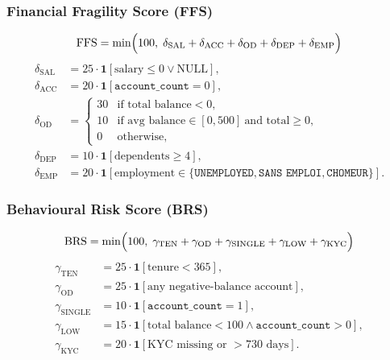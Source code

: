 \subsubsection{Financial Fragility Score (FFS)}
\begin{equation}
\label{eq:ffs}
\mathrm{FFS} = \min\Bigl(100,\;
\delta_{\mathrm{SAL}}+\delta_{\mathrm{ACC}}+\delta_{\mathrm{OD}}
+\delta_{\mathrm{DEP}}+\delta_{\mathrm{EMP}}\Bigr)
\end{equation}
\begin{equation}
\begin{aligned}
\delta_{\mathrm{SAL}} &= 25\cdot \mathbf{1}[\text{salary}\le 0 \lor \text{NULL}],\\
\delta_{\mathrm{ACC}} &= 20\cdot \mathbf{1}[\texttt{account\_count}=0],\\
\delta_{\mathrm{OD}} &=
\begin{cases}
30 & \text{if total balance}<0,\\
10 & \text{if avg balance}\in[0,500]\ \text{and total}\ge 0,\\
0 & \text{otherwise},
\end{cases}\\
\delta_{\mathrm{DEP}} &= 10\cdot \mathbf{1}[\text{dependents}\ge 4],\\
\delta_{\mathrm{EMP}} &= 20\cdot \mathbf{1}[\text{employment}\in\{\texttt{UNEMPLOYED},\texttt{SANS EMPLOI},\texttt{CHOMEUR}\}].
\end{aligned}
\end{equation}

\subsubsection{Behavioural Risk Score (BRS)}
\begin{equation}
\label{eq:brs}
\mathrm{BRS} = \min\Bigl(100,\;
\gamma_{\mathrm{TEN}}+\gamma_{\mathrm{OD}}+\gamma_{\mathrm{SINGLE}}
+\gamma_{\mathrm{LOW}}+\gamma_{\mathrm{KYC}}\Bigr)
\end{equation}
\begin{equation}
\begin{aligned}
\gamma_{\mathrm{TEN}} &= 25\cdot \mathbf{1}[\text{tenure}<365],\\
\gamma_{\mathrm{OD}} &= 25\cdot \mathbf{1}[\text{any negative-balance account}],\\
\gamma_{\mathrm{SINGLE}} &= 10\cdot \mathbf{1}[\texttt{account\_count}=1],\\
\gamma_{\mathrm{LOW}} &= 15\cdot \mathbf{1}[\text{total balance}<100 \land \texttt{account\_count}>0],\\
\gamma_{\mathrm{KYC}} &= 20\cdot \mathbf{1}[\text{KYC missing or }>730\text{ days}].
\end{aligned}
\end{equation}

